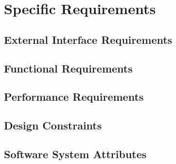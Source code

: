 \documentclass[a4paper,oneside,11pt]{article}
\begin{document}
    \newpage
    \section{Specific Requirements}
        \subsection{External Interface Requirements}
            
        \subsection{Functional Requirements}
            
        \subsection{Performance Requirements}
            
        \subsection{Design Constraints}
            
        \subsection{Software System Attributes}
            
        
            
\end{document}
